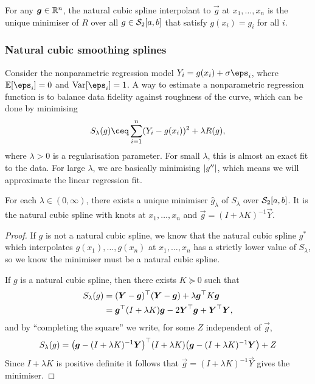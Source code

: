 \begin{proposition}
	For any $\boldsymbol g \in \mathbb R^n$, the natural cubic spline interpolant to $\vec g$ at $x_1, \dotsc, x_n$ is the unique minimiser of $R$ over all $g \in \mathcal S_2[a, b]$ that satisfy $g(x_i) = g_i$ for all $i$. 
\end{proposition}

\subsubsection{Natural cubic smoothing splines}
Consider the nonparametric regression model $Y_i = g(x_i) + \sigma \eps_i$, where $\EE[\eps_i] = 0$ and $\Var[\eps_i] = 1$. A way to estimate a nonparametric regression function is to balance data fidelity against roughness of the curve, which can be done by minimising 
\[
S_\lambda(g) \ceq \sum_{i=1}^n (Y_i - g(x_i))^2 + \lambda R(g),
\]
where $\lambda > 0$ is a regularisation parameter. For small $\lambda$, this is almost an exact fit to the data. For large $\lambda$, we are basically minimising $\abs{g''}$, which means we will approximate the linear regression fit. 

\begin{theorem}
For each $\lambda \in (0, \infty)$, there exists a unique minimiser $\hat g_\lambda$ of $S_\lambda$ over $\mathcal S_2[a, b]$. It is the natural cubic spline with knots at $x_1, \dotsc, x_n$ and $\vec g = (I + \lambda K)^{-1} \vec Y$. 
\end{theorem}

\begin{proof}
	If $g$ is not a natural cubic spline, we know that the natural cubic spline $g^*$ which interpolates $g(x_1), \dotsc, g(x_n)$ at $x_1, \dotsc, x_n$ has a strictly lower value of $S_\lambda$, so we know the minimiser must be a natural cubic spline. 
	
	If $g$ is a natural cubic spline, then there exists $K \succeq 0$ such that
	\begin{align*}
		S_\lambda(g) &= (\boldsymbol Y - \boldsymbol g)^\top (\boldsymbol Y - \boldsymbol g) + \lambda \boldsymbol g^\top K \boldsymbol g \\
		&= \boldsymbol g^\top (I + \lambda K)\boldsymbol g - 2 \boldsymbol Y^\top \boldsymbol g + \boldsymbol Y^\top\boldsymbol Y,
	\end{align*}
and by ``completing the square'' we write, for some $Z$ independent of $\vec g$, 
\[
S_\lambda(g) = \qty(\boldsymbol g - (I + \lambda K)^{-1} \boldsymbol Y)^\top (I + \lambda K) \qty(\boldsymbol g - (I + \lambda K)^{-1} \boldsymbol Y) + Z
\]
Since $I + \lambda K$ is positive definite it follows that $\vec g = (I + \lambda K)^{-1} \vec Y$ gives the minimiser. 
\end{proof}

